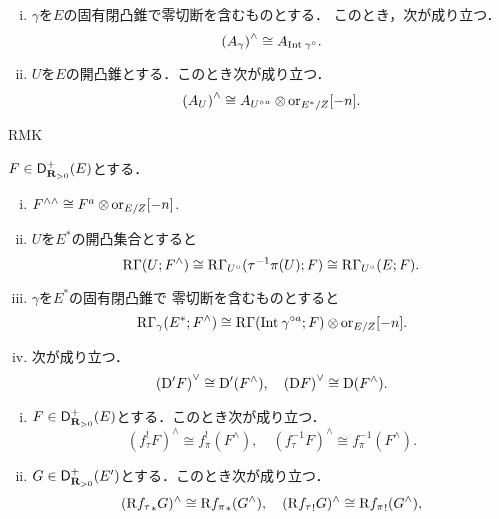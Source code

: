 \begin{LMM}[{\cite[Lemma 3.7.10]{KS90}}]
    \begin{enumerate}[(i)]
        \item \(\gamma\)を\(E\)の固有閉凸錐で零切断を含むものとする．
        このとき，次が成り立つ．\[
            \left(A_\gamma\right)^\wedge
            \cong A_{\mathop{\mathrm{Int}}\nolimits_{}{\gamma^\circ}}.
        \]
        \item \(U\)を\(E\)の開凸錐とする．このとき次が成り立つ．
        \[
            \left(A_U\right)^\wedge\cong
            A_{{U^{\circ}}^a}\tens \ori_{E^\ast/Z}[-n].
        \]
    \end{enumerate}
\end{LMM}
\begin{RMK}[{\cite[Remark 3.7.11]{KS90}}]
    RMK
\end{RMK}
\begin{PRP}[{\cite[Proposition 3.7.12]{KS90}}]
    \(F\in\mathop{\mathsf{D}^{+}_{\mathbf{R}_{>0}}}\nolimits(E)\)とする．
    \begin{enumerate}[(i)]
        \item \(F^{\wedge\wedge}\cong F^a\tens \ori_{E/Z}[-n]\).
        \item \(U\)を\(E^\ast\)の開凸集合とすると\[
            \mathop{\mathrm{R}\hspace{-0pt}\Gamma}\nolimits(U;F^\wedge)
            \cong\mathop{\mathrm{R}\hspace{-0pt}\Gamma}\nolimits_{U^\circ}(\tau^{-1}\pi(U);F)
            \cong\mathop{\mathrm{R}\hspace{-0pt}\Gamma}\nolimits_{U^\circ}(E;F).
        \]
        \item \(\gamma\)を\(E^\ast\)の固有閉凸錐で
        零切断を含むものとすると\[
            \RG_{\gamma}(E^\ast;F^\wedge)
            \cong
            \RG(\Int{\gamma^{\circ a}};F)\tens\ori_{E/Z}[-n].
        \]
        \item 次が成り立つ．\[
            \left(\mathrm{D}'F\right)^\vee\cong\mathrm{D}'(F^\wedge),
            \quad
            \left(\mathrm{D} F\right)^\vee\cong\mathrm{D}(F^\wedge).
            \]
    \end{enumerate}
\end{PRP}
\begin{PRP}[{\cite[Proposition 3.7.13]{KS90}}]
    \begin{enumerate}[(i)]
        \item \(F\in\mathop{\mathsf{D}^{+}_{\mathbf{R}_{>0}}}\nolimits(E)\)とする．このとき次が成り立つ．\[
            (f_\tau^!F)^\wedge\cong f_\pi^!(F^\wedge),
            \quad
            (f_\tau^{-1}F)^\wedge\cong f_\pi^{-1}(F^\wedge).
            \]
        \item \(G\in\mathop{\mathsf{D}^{+}_{\mathbf{R}_{>0}}}\nolimits(E')\)とする．このとき次が成り立つ．\[
            (\mathrm{R}{f_\tau}_\ast G)^\wedge\cong \mathrm{R}{f_\pi}_\ast(G^\wedge),
            \quad
            (\mathrm{R}{f_\tau}_! G)^\wedge\cong \mathrm{R}{f_\pi}_!(G^\wedge),
            \]
    \end{enumerate}
\end{PRP}
